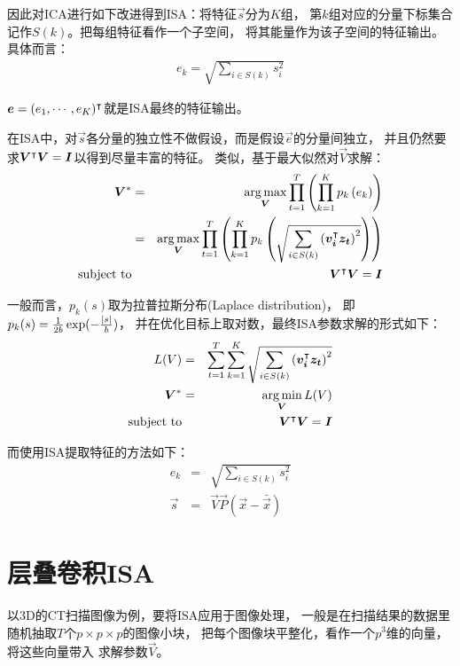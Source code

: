 因此对ICA进行如下改进得到ISA：将特征$\vec{s}$分为$K$组，
第$k$组对应的分量下标集合记作$S(k)$。把每组特征看作一个子空间，
将其能量作为该子空间的特征输出。具体而言：
\begin{eqnarray}
    e_k = \sqrt{\sum_{i\in S(k)} s_i^2}
    \label{eqn:isa:0}
\end{eqnarray}

$\boldsymbol{e} = (e_1,\cdots,e_K)^\intercal$就是ISA最终的特征输出。

在ISA中，对$\vec{s}$各分量的独立性不做假设，而是假设$\vec{e}$的分量间独立，
并且仍然要求$\boldsymbol{V}^\intercal\boldsymbol{V}=\boldsymbol{I}$以得到尽量丰富的特征。
类似，基于最大似然对$\vec{V}$求解：
\begin{eqnarray}
    \vec{V}^* &=& \argmax_{\vec{V}}
            \prod_{t=1}^T \left(
            \prod_{k=1}^K\prob[k]{e_k} \right) \nonumber \\
        &=& \argmax_{\vec{V}}
            \prod_{t=1}^T \left(
            \prod_{k=1}^K\prob[k]{\sqrt{
                \sum_{i\in S(k)}\left(\trans{\vec{v_i}}\vec{z_t}\right)^2}
            }\right) \nonumber \\
        \text{subject to} && \trans{\vec{V}}\vec{V}=\vec{I}
    \label{eqn:isa:1}
\end{eqnarray}

一般而言，$p_k(s)$取为拉普拉斯分布(Laplace distribution)，
即$p_k(s) = \frac{1}{2b}\exp(-\frac{\left|s\right|}{b})$，
并在优化目标上取对数，最终ISA参数求解的形式如下：
\begin{eqnarray}
    L(V) &=& \sum_{t=1}^T \sum_{k=1}^K
        \sqrt{\sum_{i\in S(k)}\left(\trans{\vec{v_i}}\vec{z_t}\right)^2}
        \nonumber \\
    \vec{V}^* &=& \argmin_{\vec{V}} L(V) \nonumber \\
        \text{subject to} && \trans{\vec{V}}\vec{V}=\vec{I}
    \label{eqn:isa:opt}
\end{eqnarray}

而使用ISA提取特征的方法如下：
\begin{eqnarray}
    e_k &=&  \sqrt{\sum_{i\in S(k)} s_i^2} \nonumber \\
    \vec{s} &=& \vec{V}\vec{P}(\vec{x} - \bar{\vec{x}})
    \label{eqn:isa:extract}
\end{eqnarray}


\section{层叠卷积ISA}
以3D的CT扫描图像为例，要将ISA应用于图像处理，
一般是在扫描结果的数据里随机抽取$T$个$p\times p \times p$的图像小块，
把每个图像块平整化，看作一个$p^3$维的向量，将这些向量带入
求解参数$\vec{V}$。


